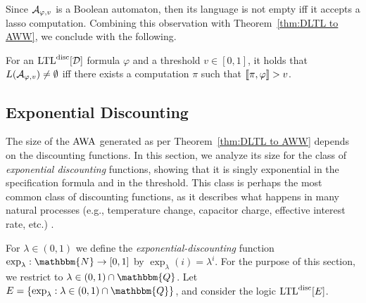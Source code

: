 \documentclass{llncs}
\newcommand{\set}[1]{{\left\{#1\right\}}}
\newcommand{\Nat}{\mathbbm{N}}
\newcommand{\Rat}{\mathbbm{Q}}
\newcommand{\LTL}{{\ensuremath{\rm LTL}}\xspace}
\newcommand{\AWW}{\mbox{\rm AWA}\xspace}
\newcommand{\D}{{\cal D}}
\newcommand{\A}{{\cal A}}
\renewcommand{\phi}{\varphi}
\newcommand{\DLTL}{\ensuremath{\LTL^{\text{disc}}[\D]}}
\newcommand{\DLTLE}{\ensuremath{\LTL^{\text{disc}}[E]}}
\newcommand{\LTLD}{\DLTL}
\begin{document}
Since $\A_{\phi,v}$ is 
a Boolean automaton, 
then its language is not empty iff it accepts a lasso computation. Combining this observation with Theorem~\ref{thm:DLTL to AWW}, we conclude with the following.
\begin{corollary}
For an $\LTLD$ formula $\phi$ and a threshold $v\in [0,1]$, it holds that $L(\A_{\phi,v})\neq \emptyset$ iff there exists a computation $\pi$ such that $\sem{\pi,\phi}>v$.
\end{corollary}

\subsection{Exponential Discounting}
\newcommand{\dfl}[1]{\exp_{#1}} \newcommand{\fac}{F}
\label{subsec:ExpDiscounting}
The size of the $\AWW$ generated as per Theorem~\ref{thm:DLTL to AWW} depends on the discounting functions.
In this section, we analyze its size for the class of {\em exponential discounting} functions, showing that it is singly exponential in the specification formula and in the threshold. This class is perhaps the most common class of discounting functions, as it describes what happens in many natural processes (e.g., temperature change, capacitor charge, effective interest rate, etc.) \cite{AHM03,Sha53}.

For $\lambda\in (0,1)$ we define the {\em exponential-discounting} function $\dfl{\lambda}:\Nat\to [0,1]$ by $\dfl{\lambda}(i)=\lambda^i$.
For the purpose of this section, we restrict to $\lambda\in (0,1)\cap \Rat$.
Let $E=\set{\dfl{\lambda}: \lambda\in (0,1)\cap \Rat}$, and consider the logic $\DLTLE$.
\end{document}
